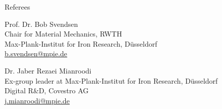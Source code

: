 \documentclass{cv}
\begin{document}

  \begin{rSection}{Referees}
    \item Prof. Dr. Bob Svendsen \href{https://www.cmm.rwth-aachen.de/cms/CMM/Forschung/Mitarbeiter/Leitung/~glyz/Bob-Svendsen/?allou=1}{\faExternalLink}\\
    {Chair for Material Mechanics, RWTH}\\
    {Max-Plank-Institut for Iron Research, Düsseldorf}\\
    \href{mailto:b.svendsen@mpie.de}{b.svendsen@mpie.de}

    \item Dr. Jaber Rezaei Mianroodi \href{https://www.mpie.de/person/59480/3079071}{\faExternalLink}\\
    {Ex-group leader at Max-Plank-Institut for Iron Research, Düsseldorf}\\
    {Digital R\&D, Covestro AG}\\
    \href{mailto:j.mianroodi@mpie.de}{j.mianroodi@mpie.de}
  \end{rSection}

  
\end{document}

